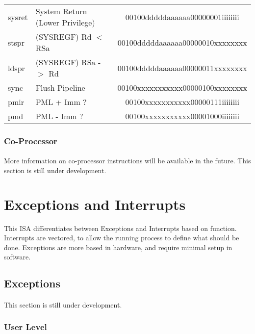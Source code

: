\documentclass[letterpaper, 11pt]{article}
\begin{document}
\begin{center}
\begin{longtable}{|l|l|c|}
			sysret		& System Return (Lower Privilege)				& 00100dddddaaaaaa00000001iiiiiiii\\
			stspr		& (SYSREGF) Rd $<$- RSa							& 00100dddddaaaaaa00000010xxxxxxxx\\
			ldspr		& (SYSREGF) RSa -$>$ Rd							& 00100dddddaaaaaa00000011xxxxxxxx\\
			sync		& Flush Pipeline								& 00100xxxxxxxxxxx00000100xxxxxxxx\\
			pmir		& PML + Imm ?									& 00100xxxxxxxxxxx00000111iiiiiiii\\
			pmd			& PML - Imm ?									& 00100xxxxxxxxxxx00001000iiiiiiii\\
			\hline
		\end{longtable}
	\end{center}


\subsubsection{Co-Processor}
\paragraph{} More information on co-processor instructions will be available
in the future. This section is still under development.

\clearpage
\section{Exceptions and Interrupts}
\paragraph{} This ISA differentiates between Exceptions and Interrupts based on function. Interrupts are vectored, to allow
the running process to define what should be done. Exceptions are more based in hardware, and require minimal setup in software.

\subsection{Exceptions}
\paragraph{} This section is still under development. 
\subsubsection{User Level}
\end{document}
